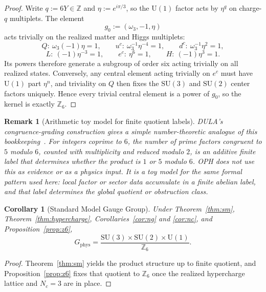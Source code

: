 \documentclass[11pt]{article}
\newtheorem{corollary}[theorem]{Corollary}
\newtheorem{remark}[theorem]{Remark}
\newcommand{\SU}{\mathrm{SU}}
\newcommand{\U}{\mathrm{U}}
\begin{document}
\begin{proof}
Write $q:=6Y\in\mathbb Z$ and $\eta:=e^{i\pi/3}$, so the $\U(1)$ factor acts by $\eta^q$ on charge-$q$ multiplets. The element
\[
g_0:=(\omega_3,-1,\eta)
\]
acts trivially on the realized matter and Higgs multiplets:
\[
Q:\ \omega_3(-1)\eta=1,\qquad
u^c:\ \omega_3^{-1}\eta^{-4}=1,\qquad
d^c:\ \omega_3^{-1}\eta^2=1,
\]
\[
L:\ (-1)\eta^{-3}=1,\qquad
e^c:\ \eta^6=1,\qquad
H:\ (-1)\eta^3=1.
\]
Its powers therefore generate a subgroup of order six acting trivially on all realized states. Conversely, any central element acting trivially on $e^c$ must have $\U(1)$ part $\eta^n$, and triviality on $Q$ then fixes the $\SU(3)$ and $\SU(2)$ center factors uniquely. Hence every trivial central element is a power of $g_0$, so the kernel is exactly $\mathbb Z_6$.
\end{proof}

\begin{remark}[Arithmetic toy model for finite quotient labels]
DULA's congruence-grading construction gives a simple number-theoretic analogue of this
bookkeeping~\cite{dula2025}. For integers coprime to \(6\), the number of prime factors
congruent to \(5\) modulo \(6\), counted with multiplicity and reduced modulo \(2\), is an
additive finite label that determines whether the product is \(1\) or \(5\) modulo \(6\). OPH does
not use this as evidence or as a physics input. It is a toy model for the same formal pattern used
here: local factor or sector data accumulate in a finite abelian label, and that label determines
the global quotient or obstruction class.
\end{remark}

\begin{corollary}[Standard Model Gauge Group]
Under Theorem~\ref{thm:sm}, Theorem~\ref{thm:hypercharge}, Corollaries~\ref{cor:ng} and \ref{cor:nc}, and Proposition~\ref{prop:z6},
\[
G_{\mathrm{phys}}=
\frac{\SU(3)\times\SU(2)\times\U(1)}{\mathbb Z_6}.
\]
\end{corollary}

\begin{proof}
Theorem~\ref{thm:sm} yields the product structure up to finite quotient, and Proposition~\ref{prop:z6} fixes that quotient to $\mathbb Z_6$ once the realized hypercharge lattice and $N_c=3$ are in place.
\end{proof}
\end{document}
